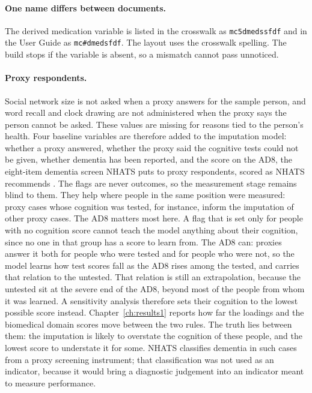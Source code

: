 \paragraph{One name differs between documents.} The derived medication variable
is listed in the crosswalk as \texttt{mc5dmedssfdf} and in the User Guide as
\texttt{mc\#dmedsfdf}. The layout uses the crosswalk spelling. The build stops
if the variable is absent, so a mismatch cannot pass unnoticed.

\paragraph{Proxy respondents.} Social network size is not asked when a proxy
answers for the sample person, and word recall and clock drawing are not
administered when the proxy says the person cannot be asked. These values are
missing for reasons tied to the person's health. Four baseline variables are
therefore added to the imputation model: whether a proxy answered, whether
the proxy said the cognitive tests could not be given, whether dementia has
been reported, and the score on the AD8, the eight-item dementia screen NHATS
puts to proxy respondents, scored as NHATS recommends
\citep{freedman_nhats_userguide_2026}. The flags are never outcomes, so the measurement stage
remains blind to them. They help where people in the same position were
measured: proxy cases whose cognition was tested, for instance, inform the
imputation of other proxy cases. The AD8 matters most here. A flag that is set
only for people with no cognition score cannot teach the model anything about
their cognition, since no one in that group has a score to learn from. The AD8
can: proxies answer it both for people who were tested and for people who were
not, so the model learns how test scores fall as the AD8 rises among the
tested, and carries that relation to the untested. That relation is still an
extrapolation, because the untested sit at the severe end of the AD8, beyond
most of the people from whom it was learned. A sensitivity analysis therefore
sets their cognition to the lowest possible score instead. Chapter~\ref{ch:results1}
reports how far the loadings and the biomedical domain scores move between
the two rules. The truth lies between them: the imputation is likely to
overstate the cognition of these people, and the lowest score to understate
it for some. NHATS classifies dementia in such cases from a proxy screening
instrument; that classification was not used as an indicator, because it
would bring a diagnostic judgement into an indicator meant to measure
performance.

